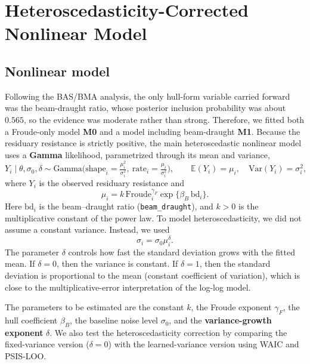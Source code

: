 \documentclass[12pt,a4paper]{article}
\begin{document}
\section{Heteroscedasticity-Corrected Nonlinear Model}


\subsection{Nonlinear model}

Following the BAS/BMA analysis, the only hull-form variable carried forward was the beam-draught ratio, whose posterior inclusion probability was about $0.565$, so the evidence was moderate rather than strong.
Therefore, we fitted both a Froude-only model \textbf{M0} and a model including beam-draught \textbf{M1}. Because the residuary resistance is strictly positive, the main heteroscedastic nonlinear model uses a \textbf{Gamma} likelihood, parametrized through its mean and variance,
\begin{equation}
Y_i \mid \theta,\sigma_0,\delta
\sim
\mathrm{Gamma}\!\Big(\text{shape}_i=\tfrac{\mu_i^2}{\sigma_i^2},\ \text{rate}_i=\tfrac{\mu_i}{\sigma_i^2}\Big),
\qquad
\mathbb{E}(Y_i)=\mu_i,\quad \mathrm{Var}(Y_i)=\sigma_i^2,
\end{equation}
where $Y_i$ is the observed residuary resistance and
\begin{equation}
\mu_i
=
k\,\mathrm{Froude}_i^{\gamma_F}
\exp\{\beta_B\,\mathrm{bd}_i\}.
\end{equation}
Here $\mathrm{bd}_i$ is the beam--draught ratio (\texttt{beam\_draught}), and
$k>0$ is the multiplicative constant of the power law.
To model heteroscedasticity, we did not assume a constant variance. Instead, we used
\begin{equation}
\sigma_i = \sigma_0 \mu_i^\delta .
\end{equation}
The parameter $\delta$ controls how fast the standard deviation grows with the fitted mean.
If $\delta=0$, then the variance is constant.
If $\delta=1$, then the standard deviation is proportional to the mean (constant coefficient of variation), which is close to the multiplicative-error interpretation of the log-log model.

The parameters to be estimated are the constant $k$, the Froude exponent $\gamma_F$, the
hull coefficient $\beta_B$, the baseline noise level $\sigma_0$, and the
\textbf{variance-growth exponent} $\delta$. We also test the heteroscedasticity correction
by comparing the fixed-variance version ($\delta=0$) with the learned-variance version using WAIC and PSIS-LOO.
\end{document}
